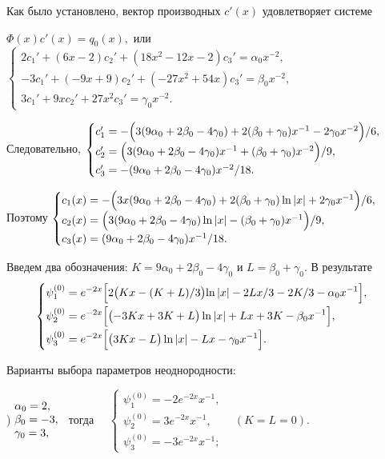 \documentclass[11pt]{article}
\begin{document}
{%
Как было установлено, вектор производных $c'(x)$ удовлетворяет системе

\smallskip
$\Phi(x)c'(x)=q_0(x),$ 
или
$\begin{cases}
2c_1' + (6x - 2)c_2' + (18x^2 - 12x - 2)c_3' = \alpha_0 x^{-2}, \\
-3c_1' + (-9x + 9)c_2' + (-27x^2 + 54x)c_3' = \beta_0 x^{-2}, \\
3c_1' + 9x c_2' + 27x^2 c_3' = \gamma_0 x^{-2}.
\end{cases}$

Следовательно, 
$\begin{cases} c_1' = -\Bigl( 3(9\alpha_0 + 2\beta_0 -4\gamma_0) + 2(\beta_0 + \gamma_0) x^{-1} - 2\gamma_0 x^{-2} \Bigl)/6,\\ 
c_2' = \Bigl(3(9\alpha_0 + 2\beta_0 - 4\gamma_0)x^{-1} + (\beta_0 + \gamma_0)x^{-2}\Bigl)/9,\\  
c_3' = -(9\alpha_0 + 2\beta_0 - 4\gamma_0)x^{-2}/18.\end{cases}$

Поэтому 
$\begin{cases} 
c_1(x) = -\Bigl(3x (9\alpha_0 + 2\beta_0 - 4\gamma_0) + 2(\beta_0 + \gamma_0) \ln|x| + 2\gamma_0 x^{-1} \Bigl)/6,\\ 
c_2(x) = \Bigl(3(9\alpha_0 + 2\beta_0 - 4\gamma_0)\ln |x| - (\beta_0 + \gamma_0)x^{-1}\Bigl)/9,\\ 
c_3(x) = (9\alpha_0 + 2\beta_0 - 4\gamma_0)x^{-1}/18.\end{cases}$

Введем два обозначения: $K=9\alpha_0+2\beta_0-4\gamma_0$ и $L = \beta_0+\gamma_0.$
В результате 
\[
\begin{cases}
\begin{aligned}
\psi_1^{(0)} &= e^{-2x} \Bigl[ 2\bigl( Kx-(K+L)/3 \bigl)\ln |x| - 2Lx/3 - 2K/3 - \alpha_0 x^{-1} \Bigr], \\
\psi_2^{(0)} &= e^{-2x} \Bigl[ \bigl( -3Kx + 3K + L \bigr)\ln |x| + Lx + 3K - \beta_0 x^{-1} \Bigr], \\
\psi_3^{(0)} &= e^{-2x} \Bigl[ \bigl( 3Kx - L \bigr)\ln |x| - Lx - \gamma_0x^{-1} \Bigr].
\end{aligned}
\end{cases}
\]

Варианты выбора параметров неоднородности:

) $\begin{matrix} \alpha_0 = 2,\hfill\\ \beta_0 = -3,\\ \gamma_0 = 3,\hfill \end{matrix}$ \ 
тогда \ \ $\begin{cases} 
\psi_1^{(0)}= -2e^{-2x} x^{-1},\\ \psi_2^{(0)}= 3e^{-2x} x^{-1},\\ \psi_3^{(0)}= -3e^{-2x} x^{-1}; \end{cases}$ \
$(K=L=0).$

}
\end{document}

